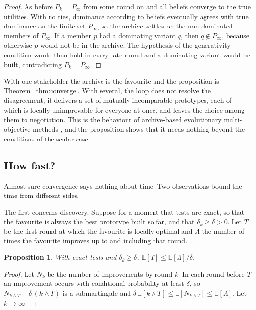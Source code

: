 \documentclass[10pt,twocolumn]{article}
\newcommand{\E}{\mathbb{E}}
\newcommand{\Pk}{P_k}
\newtheorem{proposition}{Proposition}
\theoremstyle{definition}
\begin{document}
\begin{proof}
As before $\Pk=P_\infty$ from some round on and all beliefs converge to the true utilities. With no ties, dominance according to beliefs eventually agrees with true dominance on the finite set $P_\infty$, so the archive settles on the non-dominated members of $P_\infty$. If a member $p$ had a dominating variant $q$, then $q\notin P_\infty$, because otherwise $p$ would not be in the archive. The hypothesis of the generativity condition would then hold in every late round and a dominating variant would be built, contradicting $\Pk=P_\infty$.
\end{proof}

With one stakeholder the archive is the favourite and the proposition is Theorem~\ref{thm:converge}. With several, the loop does not resolve the disagreement; it delivers a set of mutually incomparable prototypes, each of which is locally unimprovable for everyone at once, and leaves the choice among them to negotiation. This is the behaviour of archive-based evolutionary multi-objective methods \citep{laumanns2002}, and the proposition shows that it needs nothing beyond the conditions of the scalar case.

\subsection{How fast?}
\label{sec:rates}

Almost-sure convergence says nothing about time. Two observations bound the time from different sides.

The first concerns discovery. Suppose for a moment that tests are exact, so that the favourite is always the best prototype built so far, and that $\delta_k\ge\delta>0$. Let $T$ be the first round at which the favourite is locally optimal and $\Lambda$ the number of times the favourite improves up to and including that round.

\begin{proposition}
\label{prop:rate}
With exact tests and $\delta_k\ge\delta$, $\E[T]\le\E[\Lambda]/\delta$.
\end{proposition}

\begin{proof}
Let $N_k$ be the number of improvements by round $k$. In each round before $T$ an improvement occurs with conditional probability at least $\delta$, so $N_{k\wedge T}-\delta\,(k\wedge T)$ is a submartingale and $\delta\,\E[k\wedge T]\le\E[N_{k\wedge T}]\le\E[\Lambda]$. Let $k\to\infty$.
\end{proof}
\end{document}
